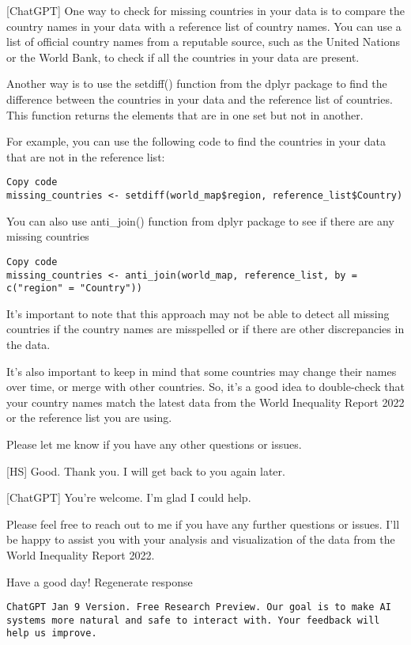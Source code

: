 \documentclass[
]{book}
\theoremstyle{definition}
\theoremstyle{definition}
\theoremstyle{definition}
\theoremstyle{definition}
\theoremstyle{remark}
\begin{document}
{[}ChatGPT{]} One way to check for missing countries in your data is to compare the country names in your data with a reference list of country names. You can use a list of official country names from a reputable source, such as the United Nations or the World Bank, to check if all the countries in your data are present.

Another way is to use the setdiff() function from the dplyr package to find the difference between the countries in your data and the reference list of countries. This function returns the elements that are in one set but not in another.

For example, you can use the following code to find the countries in your data that are not in the reference list:

\begin{verbatim}
Copy code
missing_countries <- setdiff(world_map$region, reference_list$Country)
\end{verbatim}

You can also use anti\_join() function from dplyr package to see if there are any missing countries

\begin{verbatim}
Copy code
missing_countries <- anti_join(world_map, reference_list, by = c("region" = "Country"))
\end{verbatim}

It's important to note that this approach may not be able to detect all missing countries if the country names are misspelled or if there are other discrepancies in the data.

It's also important to keep in mind that some countries may change their names over time, or merge with other countries. So, it's a good idea to double-check that your country names match the latest data from the World Inequality Report 2022 or the reference list you are using.

Please let me know if you have any other questions or issues.

{[}HS{]} Good. Thank you. I will get back to you again later.

{[}ChatGPT{]} You're welcome. I'm glad I could help.

Please feel free to reach out to me if you have any further questions or issues. I'll be happy to assist you with your analysis and visualization of the data from the World Inequality Report 2022.

Have a good day!
Regenerate response

\begin{verbatim}
ChatGPT Jan 9 Version. Free Research Preview. Our goal is to make AI systems more natural and safe to interact with. Your feedback will help us improve.
\end{verbatim}
\end{document}
